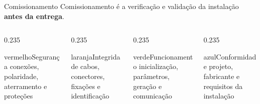 \documentclass[aspectratio=169,10pt,xcolor=table]{beamer}
\begin{document}
\begin{frame}{Comissionamento}
  \alert{Comissionamento} é a verificação e validação da instalação \textbf{antes da entrega}.
  \vspace{0.5em}
  \begin{columns}[T]
    \begin{column}{0.235\textwidth}
      \begin{card}[equal height group=cm]{vermelho}{\faShield*\enspace Segurança}
        conexões, polaridade, aterramento e proteções
      \end{card}
    \end{column}
    \begin{column}{0.235\textwidth}
      \begin{card}[equal height group=cm]{laranja}{\faCubes\enspace Integridade}
        cabos, conectores, fixações e identificação
      \end{card}
    \end{column}
    \begin{column}{0.235\textwidth}
      \begin{card}[equal height group=cm]{verde}{\faCogs\enspace Funciona\-mento}
        inicialização, parâmetros, geração e comunicação
      \end{card}
    \end{column}
    \begin{column}{0.235\textwidth}
      \begin{card}[equal height group=cm]{azul}{\faClipboardCheck\enspace Conformidade}
        projeto, fabricante e requisitos da instalação
      \end{card}
    \end{column}
  \end{columns}
  \vspace{0.4em}
  \begin{center}
  \end{center}
\end{frame}
\end{document}
